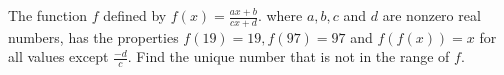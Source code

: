 The function $f$ defined by $\displaystyle f(x)= \frac{ax+b}{cx+d}$. where $a,b,c$ and $d$ are nonzero real numbers, has the properties $f(19)=19, f(97)=97$ and $f(f(x))=x$ for all values except $\displaystyle \frac{-d}{c}$. Find the unique number that is not in the range of $f$.